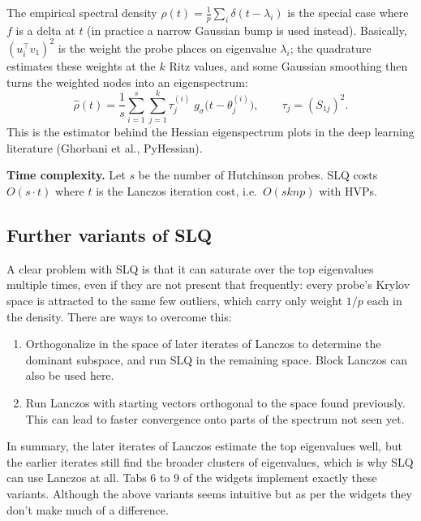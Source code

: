 \documentclass[11pt]{article}
\begin{document}
The empirical spectral density $\rho(t) = \frac{1}{p}\sum_i \delta(t - \lambda_i)$ is the special case where $f$ is a delta at $t$ (in practice a narrow Gaussian bump is used instead). Basically, $(u_i^\top v_1)^2$ is the weight the probe places on eigenvalue $\lambda_i$; the quadrature estimates these weights at the $k$ Ritz values, and some Gaussian smoothing then turns the weighted nodes into an eigenspectrum:
\[
\hat\rho(t) = \frac{1}{s}\sum_{i=1}^{s} \sum_{j=1}^{k} \tau_j^{(i)}\; g_\sigma\big(t - \theta_j^{(i)}\big),
\qquad \tau_j = (S_{1j})^2 .
\]
This is the estimator behind the Hessian eigenspectrum plots in the deep learning literature (Ghorbani et al., PyHessian).

\textbf{Time complexity.} Let $s$ be the number of Hutchinson probes. SLQ costs $O(s \cdot t)$ where $t$ is the Lanczos iteration cost, i.e.\ $O(sknp)$ with HVPs.

\subsection{Further variants of SLQ}

A clear problem with SLQ is that it can saturate over the top eigenvalues multiple times, even if they are not present that frequently: every probe's Krylov space is attracted to the same few outliers, which carry only weight $1/p$ each in the density. There are ways to overcome this:
\begin{enumerate}
\item[a)] Orthogonalize in the space of later iterates of Lanczos to determine the dominant subspace, and run SLQ in the remaining space. Block Lanczos can also be used here.
\item[b)] Run Lanczos with starting vectors orthogonal to the space found previously. This can lead to faster convergence onto parts of the spectrum not seen yet.
\end{enumerate}
In summary, the later iterates of Lanczos estimate the top eigenvalues well, but the earlier iterates still find the broader clusters of eigenvalues, which is why SLQ can use Lanczos at all.
Tabs 6 to 9 of the widgets implement exactly these variants. Although the above variants seems intuitive but as per the widgets they don't make much of a difference.
\end{document}
